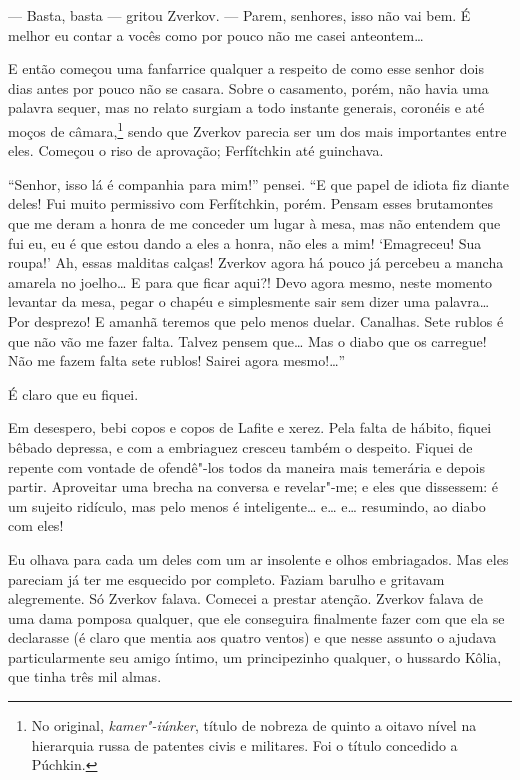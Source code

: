 --- Basta, basta --- gritou Zverkov. --- Parem, senhores, isso não vai bem. É
melhor eu contar a vocês como por pouco não me casei anteontem\ldots{}

E então começou uma fanfarrice qualquer a respeito de como esse senhor
dois dias antes por pouco não se casara. Sobre o casamento, porém, não
havia uma palavra sequer, mas no relato surgiam a todo instante
generais, coronéis e até moços de câmara,\footnote{ No original,
\textit{kamer"-iúnker}, título de nobreza de quinto a oitavo nível na
hierarquia russa de patentes civis e militares. Foi o título concedido a
Púchkin.} sendo que Zverkov parecia ser um dos mais importantes entre
eles. Começou o riso de aprovação; Ferfítchkin até guinchava.


``Senhor, isso lá é companhia para mim!'' pensei. ``E que papel de idiota
fiz diante deles! Fui muito permissivo com Ferfítchkin, porém. Pensam
esses brutamontes que me deram a honra de me conceder um lugar à mesa,
mas não entendem que fui eu, eu é que estou dando a eles a honra, não
eles a mim! `Emagreceu! Sua roupa!' Ah, essas malditas calças! Zverkov
agora há pouco já percebeu a mancha amarela no joelho\ldots{} E para que
ficar aqui?! Devo agora mesmo, neste momento levantar da mesa, pegar o
chapéu e simplesmente sair sem dizer uma palavra\ldots{} Por desprezo! E
amanhã teremos que pelo menos duelar. Canalhas. Sete rublos é que não
vão me fazer falta. Talvez pensem que\ldots{} Mas o diabo que os carregue!
Não me fazem falta sete rublos! Sairei agora mesmo!\ldots{}''

É claro que eu fiquei.

Em desespero, bebi copos e copos de Lafite e xerez. Pela falta de
hábito, fiquei bêbado depressa, e com a embriaguez cresceu também o
despeito. Fiquei de repente com vontade de ofendê"-los todos da maneira
mais temerária e depois partir. Aproveitar uma brecha na conversa e
revelar"-me; e eles que dissessem: é um sujeito ridículo, mas pelo menos
é inteligente\ldots{} e\ldots{} e\ldots{} resumindo, ao diabo com eles!

Eu olhava para cada um deles com um ar insolente e olhos embriagados.
Mas eles pareciam já ter me esquecido por completo. Faziam barulho e
gritavam alegremente. Só Zverkov falava. Comecei a prestar atenção.
Zverkov falava de uma dama pomposa qualquer, que ele conseguira
finalmente fazer com que ela se declarasse (é claro que mentia aos
quatro ventos) e que nesse assunto o ajudava particularmente seu amigo
íntimo, um principezinho qualquer, o hussardo Kôlia, que tinha três mil
almas.


